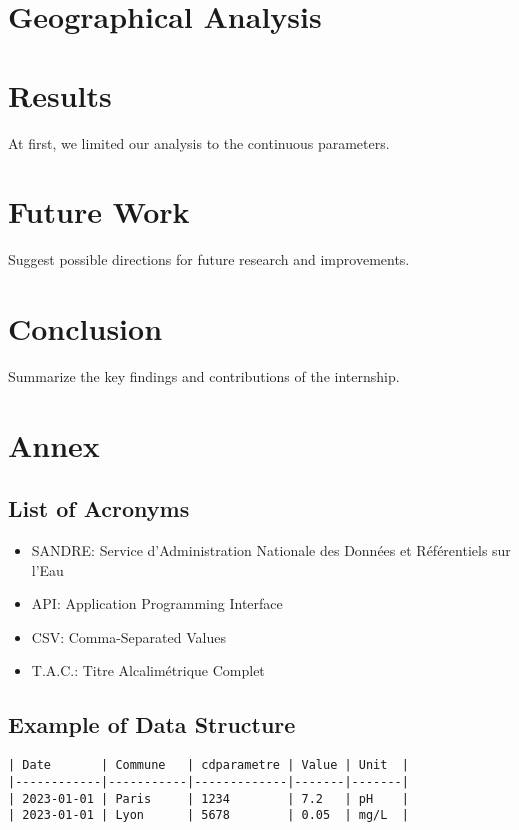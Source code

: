 \documentclass{article}
\begin{document}
\section{Geographical Analysis}


\section{Results}
At first, we limited our analysis to the continuous parameters.


\section{Future Work}
Suggest possible directions for future research and improvements.

\section{Conclusion}
Summarize the key findings and contributions of the internship.

\appendix
\section{Annex}

\subsection{List of Acronyms}
\begin{itemize}
    \item SANDRE: Service d’Administration Nationale des Données et Référentiels sur l’Eau
    \item API: Application Programming Interface
    \item CSV: Comma-Separated Values
    \item T.A.C.: Titre Alcalimétrique Complet
\end{itemize}

\subsection{Example of Data Structure}
\begin{verbatim}
| Date       | Commune   | cdparametre | Value | Unit  |
|------------|-----------|-------------|-------|-------|
| 2023-01-01 | Paris     | 1234        | 7.2   | pH    |
| 2023-01-01 | Lyon      | 5678        | 0.05  | mg/L  |
\end{verbatim}
\end{document}
